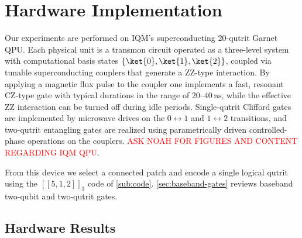 \section{Hardware Implementation}
\label{sec:hardware}

Our experiments are performed on IQM's superconducting 20-qutrit Garnet QPU.  Each physical unit is a transmon circuit operated as a three-level system with computational basis states $\{\ket{0},\ket{1},\ket{2}\}$, coupled via tunable superconducting couplers that generate a ZZ-type interaction.  By applying a magnetic
flux pulse to the coupler one implements a fast, resonant CZ-type gate with typical durations in the range of $20$--$40\,\mathrm{ns}$, while
the effective ZZ interaction can be turned off during idle periods. Single-qutrit Clifford gates are implemented by microwave drives on the
$0\!\leftrightarrow\!1$ and $1\!\leftrightarrow\!2$ transitions, and two-qutrit entangling gates are realized using parametrically driven controlled-phase operations on the couplers. \textcolor{red}{ASK NOAH FOR FIGURES AND CONTENT REGARDING IQM QPU}.

From this device we select a connected patch and encode a single logical qutrit using the $[[5,1,2]]_3$ code of \autoref{sub:code}. \autoref{sec:baseband-gates} reviews baseband two-qubit and two-qutrit gates.

\subsection{Hardware Results}
\label{sub:hardware_results}
